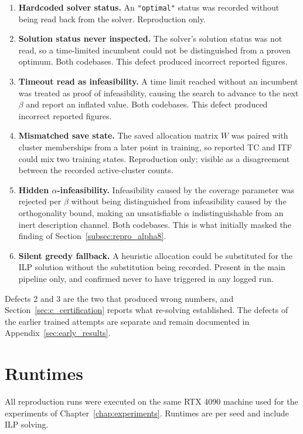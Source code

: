 \begin{enumerate}[itemsep=2pt]
    \item \textbf{Hardcoded solver status.} An \texttt{"optimal"} status was recorded without being read back from the solver. Reproduction only.
    \item \textbf{Solution status never inspected.} The solver's solution status was not read, so a time-limited incumbent could not be distinguished from a proven optimum. Both codebases. This defect produced incorrect reported figures.
    \item \textbf{Timeout read as infeasibility.} A time limit reached without an incumbent was treated as proof of infeasibility, causing the search to advance to the next $\beta$ and report an inflated value. Both codebases. This defect produced incorrect reported figures.
    \item \textbf{Mismatched save state.} The saved allocation matrix $W$ was paired with cluster memberships from a later point in training, so reported TC and ITF could mix two training states. Reproduction only; visible as a disagreement between the recorded active-cluster counts.
    \item \textbf{Hidden $\alpha$-infeasibility.} Infeasibility caused by the coverage parameter was rejected per $\beta$ without being distinguished from infeasibility caused by the orthogonality bound, making an unsatisfiable $\alpha$ indistinguishable from an inert description channel. Both codebases. This is what initially masked the finding of Section~\ref{subsec:repro_alpha8}.
    \item \textbf{Silent greedy fallback.} A heuristic allocation could be substituted for the ILP solution without the substitution being recorded. Present in the main pipeline only, and confirmed never to have triggered in any logged run.
\end{enumerate}

Defects 2 and 3 are the two that produced wrong numbers, and Section~\ref{sec:c_certification} reports what re-solving established. The defects of the earlier trained attempts are separate and remain documented in Appendix~\ref{sec:early_results}.

\section{Runtimes}
\label{sec:c_runtimes}

All reproduction runs were executed on the same RTX 4090 machine used for the experiments of Chapter~\ref{chap:experiments}. Runtimes are per seed and include ILP solving.

